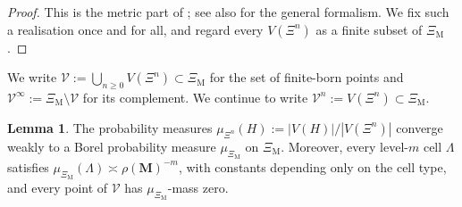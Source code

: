 \documentclass{article}
\theoremstyle{plain}
\theoremstyle{definition}
\newtheorem{lemma}[theorem]{Lemma}
\begin{document}
\begin{proof}
This is the metric part of \cite{neroli2024fractal}; see also \cite{burago2001course,abraham2013note} for the general formalism.
We fix such a realisation once and for all, and regard every $V(\Xi^n)$ as a finite subset of $\Xi_{\mathrm M}$.
\end{proof}

We write $\mathscr V:=\bigcup_{n\ge 0}V(\Xi^n)\subset \Xi_{\mathrm M}$ for the set of finite-born points and $\mathscr V^\infty:=\Xi_{\mathrm M}\setminus \mathscr V$ for its complement.
We continue to write $\mathscr V^n:=V(\Xi^n)\subset \Xi_{\mathrm M}$.

\begin{lemma}\label{lem:GHP_convergence}
The probability measures $\mu_{\Xi^n}(H):=|V(H)|/|V(\Xi^n)|$ converge weakly to a Borel probability measure $\mu_{\Xi_{\mathrm M}}$ on $\Xi_{\mathrm M}$.
Moreover, every level-$m$ cell $\Lambda$ satisfies $\mu_{\Xi_{\mathrm M}}(\Lambda)\asymp \rho(\mathbf M)^{-m}$, with constants depending only on the cell type, and every point of $\mathscr V$ has $\mu_{\Xi_{\mathrm M}}$-mass zero.
\end{lemma}
\end{document}
